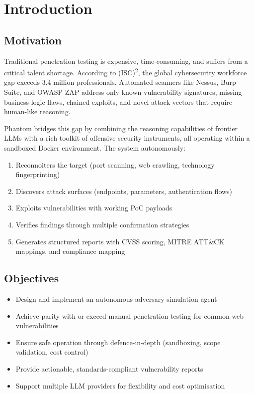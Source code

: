 \documentclass[12pt,a4paper]{report}
\begin{document}
\tableofcontents
\listoffigures
\listoftables

\chapter{Introduction}
\label{ch:intro}

\section{Motivation}
Traditional penetration testing is expensive, time-consuming, and suffers from
a critical talent shortage. According to (ISC)\textsuperscript{2}, the global
cybersecurity workforce gap exceeds 3.4 million professionals. Automated
scanners like Nessus, Burp Suite, and OWASP ZAP address only known
vulnerability signatures, missing business logic flaws, chained exploits, and
novel attack vectors that require human-like reasoning.

Phantom bridges this gap by combining the reasoning capabilities of frontier
LLMs with a rich toolkit of offensive security instruments, all operating within
a sandboxed Docker environment. The system autonomously:
\begin{enumerate}[noitemsep]
  \item Reconnoiters the target (port scanning, web crawling, technology fingerprinting)
  \item Discovers attack surfaces (endpoints, parameters, authentication flows)
  \item Exploits vulnerabilities with working PoC payloads
  \item Verifies findings through multiple confirmation strategies
  \item Generates structured reports with CVSS scoring, MITRE ATT\&CK mappings, and compliance mapping
\end{enumerate}

\section{Objectives}
\begin{itemize}[noitemsep]
  \item Design and implement an autonomous adversary simulation agent
  \item Achieve parity with or exceed manual penetration testing for common web vulnerabilities
  \item Ensure safe operation through defence-in-depth (sandboxing, scope validation, cost control)
  \item Provide actionable, standards-compliant vulnerability reports
  \item Support multiple LLM providers for flexibility and cost optimisation
\end{itemize}
\end{document}
